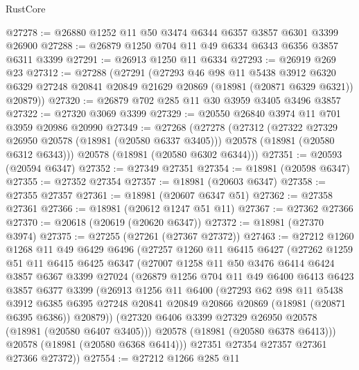 \begin{lexlean}{RustCore}
\begin{coremodule}
@27278 := @26880 @1252 @11 @50 @3474 @6344 @6357 @3857 @6301 @3399 @26900
@27288 := @26879 @1250 @704 @11 @49 @6334 @6343 @6356 @3857 @6311 @3399
@27291 := @26913 @1250 @11 @6334
@27293 := @26919 @269 @23
@27312 := @27288
    (@27291
      (@27293
        @46
        @98
        @11
        @5438
        @3912
        @6320
        @6329
        @27248
        @20841
        @20849
        @21629
        @20869
        (@18981 (@20871 @6329 @6321))
        @20879))
@27320 := @26879 @702 @285 @11 @30 @3959 @3405 @3496 @3857
@27322 := @27320 @3069 @3399
@27329 := @20550 @26840 @3974 @11 @701 @3959 @20986 @20990
@27349 := @27268
    (@27278
      (@27312
        (@27322 @27329 @26950 @20578 (@18981 (@20580 @6337 @3405)))
        @20578
        (@18981 (@20580 @6312 @6343)))
      @20578
      (@18981 (@20580 @6302 @6344)))
@27351 := @20593 (@20594 @6347)
@27352 := @27349 @27351
@27354 := @18981 (@20598 @6347)
@27355 := @27352 @27354
@27357 := @18981 (@20603 @6347)
@27358 := @27355 @27357
@27361 := @18981 (@20607 @6347 @51)
@27362 := @27358 @27361
@27366 := @18981 (@20612 @1247 @51 @11)
@27367 := @27362 @27366
@27370 := @20618 (@20619 (@20620 @6347))
@27372 := @18981 (@27370 @3974)
@27375 := @27255 (@27261 (@27367 @27372))
@27463 := @27212
    @1260
    @1268
    @11
    @49
    @6429
    @6496
    (@27257
      @1260
      @11
      @6415
      @6427
      (@27262
        @1259
        @51
        @11
        @6415
        @6425
        @6347
        (@27007
          @1258
          @11
          @50
          @3476
          @6414
          @6424
          @3857
          @6367
          @3399
          @27024
          (@26879
            @1256
            @704
            @11
            @49
            @6400
            @6413
            @6423
            @3857
            @6377
            @3399
            (@26913
              @1256
              @11
              @6400
              (@27293
                @62
                @98
                @11
                @5438
                @3912
                @6385
                @6395
                @27248
                @20841
                @20849
                @20866
                @20869
                (@18981 (@20871 @6395 @6386))
                @20879))
            (@27320 @6406 @3399 @27329 @26950 @20578 (@18981 (@20580 @6407 @3405)))
            @20578
            (@18981 (@20580 @6378 @6413)))
          @20578
          (@18981 (@20580 @6368 @6414)))
        @27351
        @27354
        @27357
        @27361
        @27366
        @27372))
@27554 := @27212
    @1266
    @285
    @11

\end{coremodule}
\end{lexlean}
